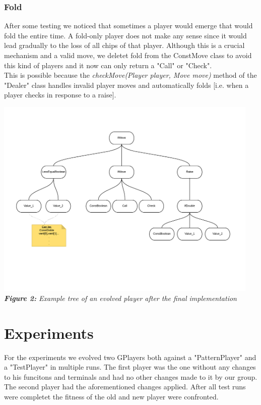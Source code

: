 \documentclass[12pt,fleqn,a4paper]{article}
\begin{document}
\subsubsection{Fold}
After some testing we noticed that sometimes a player would emerge that would fold the entire time. A fold-only player does not make any sense since it would lead gradually to the loss of all chips of that player. Although this is a crucial mechanism and a valid move, we deletet fold from the ConstMove class to avoid this kind of players and it now can only return a "Call" or "Check". \\
This is possible because the \textit{checkMove(Player player, Move move)} method of the "Dealer" class handles invalid player moves and automatically folds [i.e. when a player checks in response to a raise].

\begin{center}
	\includegraphics[width=0.95\textwidth]{NewRaise.png}
	\textit{\textbf{Figure 2: }Example tree of an evolved player after the final implementation} 
\end{center}

\newpage
\section{Experiments}
For the experiments we evolved two GPlayers both against a "PatternPlayer" and a "TestPlayer" in multiple runs. The first player was the one without any changes to his funcitons and terminals and had no other changes made to it by our group. The second player had the aforementioned changes applied. After all test runs were completet the fitness of the old and new player were confronted.
\end{document}
